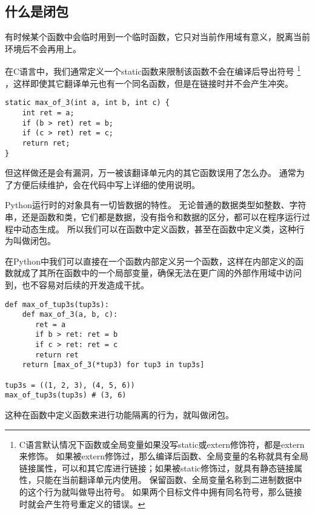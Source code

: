 \documentclass{ctexbook}
\begin{document}
\subsection{什么是闭包}

有时候某个函数中会临时用到一个临时函数，它只对当前作用域有意义，脱离当前环境后不会再用上。


在C语言中，我们通常定义一个static函数来限制该函数不会在编译后导出符号
\footnote{C语言默认情况下函数或全局变量如果没写static或extern修饰符，都是extern来修饰。
如果被extern修饰过，那么编译后函数、全局变量的名称就具有全局链接属性，可以和其它库进行链接；如果被static修饰过，就具有静态链接属性，只能在当前翻译单元内使用。
保留函数、全局变量名称到二进制数据中的这个行为就叫做导出符号。
如果两个目标文件中拥有同名符号，那么链接时就会产生符号重定义的错误。}
，这样即使其它翻译单元也有一个同名函数，但是在链接时并不会产生冲突。

\begin{verbatim}
static max_of_3(int a, int b, int c) {
    int ret = a;
    if (b > ret) ret = b;
    if (c > ret) ret = c;
    return ret;
}
\end{verbatim}

但这样做还是会有漏洞，万一被该翻译单元内的其它函数误用了怎么办。
通常为了方便后续维护，会在代码中写上详细的使用说明。

Python运行时的对象具有一切皆数据的特性。
无论普通的数据类型如整数、字符串，还是函数和类，它们都是数据，没有指令和数据的区分，都可以在程序运行过程中动态生成。
所以我们可以在函数中定义函数，甚至在函数中定义类，这种行为叫做闭包。

在Python中我们可以直接在一个函数内部定义另一个函数，这样在内部定义的函数就成了其所在函数中的一个局部变量，确保无法在更广阔的外部作用域中访问到，也不容易对后续的开发造成干扰。

\begin{verbatim}
def max_of_tup3s(tup3s):
    def max_of_3(a, b, c):
       ret = a
       if b > ret: ret = b
       if c > ret: ret = c
       return ret
    return [max_of_3(*tup3) for tup3 in tup3s]

tup3s = ((1, 2, 3), (4, 5, 6))
max_of_tup3s(tup3s) # (3, 6)
\end{verbatim}

这种在函数中定义函数来进行功能隔离的行为，就叫做闭包。
\end{document}
